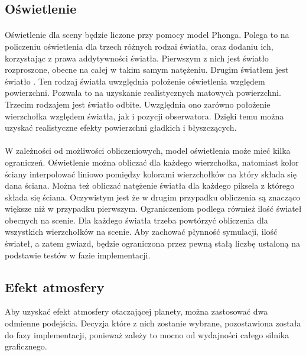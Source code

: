 \subsection{Oświetlenie}\label{sub:oswietlenie}

\paragraph{}

Oświetlenie dla sceny będzie liczone przy pomocy model Phonga. Polega to na policzeniu oświetlenia dla trzech różnych rodzai światła, oraz dodaniu ich, korzystając z prawa addytywności światła. Pierwszym z nich jest światło rozproszone, obecne na całej w takim samym natężeniu. Drugim światłem jest światło . Ten rodzaj światła uwzględnia położenie oświetlenia względem powierzchni. Pozwala to na uzyskanie realistycznych matowych powierzchni. Trzecim rodzajem jest światło odbite. Uwzględnia ono zarówno położenie wierzchołka względem światła, jak i pozycji obserwatora. Dzięki temu można uzyskać realistyczne efekty powierzchni gładkich i błyszczących.

\paragraph{}

W zależności od możliwości obliczeniowych, model oświetlenia może mieć kilka ograniczeń. Oświetlenie można obliczać dla każdego wierzchołka, natomiast kolor ściany interpolować liniowo pomiędzy kolorami wierzchołków na który składa się dana ściana. Można też obliczać natężenie światła dla każdego piksela z którego składa się ściana. Oczywistym jest że w drugim przypadku obliczenia są znacząco większe niż w przypadku pierwszym. Ograniczeniom podlega również ilość świateł obecnych na scenie. Dla każdego światła trzeba powtórzyć obliczenia dla wszystkich wierzchołków na scenie. Aby zachować płynność symulacji, ilość świateł, a zatem gwiazd, będzie ograniczona przez pewną stałą liczbę ustaloną na podstawie testów w fazie implementacji.

\subsection{Efekt atmosfery}\label{sub:efekt atmosfery}

Aby uzyskać efekt atmosfery otaczającej planety, można zastosować dwa odmienne podejścia. Decyzja które z nich zostanie wybrane, pozostawiona została do fazy implementacji, ponieważ zależy to mocno od wydajności całego silnika graficznego.

